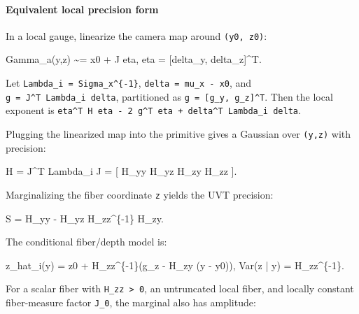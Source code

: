 \documentclass[
]{article}
\newenvironment{Shaded}{}{}
\newcommand{\NormalTok}[1]{#1}
\begin{document}
\paragraph{Equivalent local precision
form}\label{equivalent-local-precision-form}

In a local gauge, linearize the camera map around \texttt{(y0,\ z0)}:

\begin{Shaded}
\begin{Highlighting}[]
\NormalTok{Gamma\_a(y,z) \textasciitilde{}= x0 + J eta,}
\NormalTok{eta = [delta\_y, delta\_z]\^{}T.}
\end{Highlighting}
\end{Shaded}

Let \texttt{Lambda\_i\ =\ Sigma\_x\^{}\{-1\}},
\texttt{delta\ =\ mu\_x\ -\ x0}, and
\texttt{g\ =\ J\^{}T\ Lambda\_i\ delta}, partitioned as
\texttt{g\ =\ {[}g\_y,\ g\_z{]}\^{}T}. Then the local exponent is
\texttt{eta\^{}T\ H\ eta\ -\ 2\ g\^{}T\ eta\ +\ delta\^{}T\ Lambda\_i\ delta}.

Plugging the linearized map into the primitive gives a Gaussian over
\texttt{(y,z)} with precision:

\begin{Shaded}
\begin{Highlighting}[]
\NormalTok{H = J\^{}T Lambda\_i J}
\NormalTok{  = [ H\_yy  H\_yz}
\NormalTok{      H\_zy  H\_zz ].}
\end{Highlighting}
\end{Shaded}

Marginalizing the fiber coordinate \texttt{z} yields the UVT precision:

\begin{Shaded}
\begin{Highlighting}[]
\NormalTok{S = H\_yy {-} H\_yz H\_zz\^{}\{{-}1\} H\_zy.}
\end{Highlighting}
\end{Shaded}

The conditional fiber/depth model is:

\begin{Shaded}
\begin{Highlighting}[]
\NormalTok{z\_hat\_i(y) = z0 + H\_zz\^{}\{{-}1\}(g\_z {-} H\_zy (y {-} y0)),}
\NormalTok{Var(z | y) = H\_zz\^{}\{{-}1\}.}
\end{Highlighting}
\end{Shaded}

For a scalar fiber with \texttt{H\_zz\ \textgreater{}\ 0}, an
untruncated local fiber, and locally constant fiber-measure factor
\texttt{J\_0}, the marginal also has amplitude:
\end{document}
